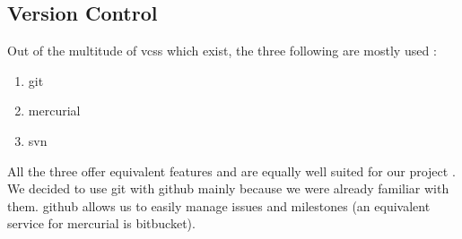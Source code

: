 \subsection{Version Control}
Out of the multitude of \glspl{vcs} which exist, the three following are mostly used \cite{rhodecodeVCS}:
\begin{enumerate}
\item \gls{git}
\item \gls{mercurial}
\item \gls{svn}
\end{enumerate}
All the three offer equivalent features and are equally well suited for our project \cite{thomson2008relax}. We decided to use \gls{git} with \gls{github} mainly because we were already familiar with them. \Gls{github} allows us to easily manage issues and milestones (an equivalent service for mercurial is \gls{bitbucket}).